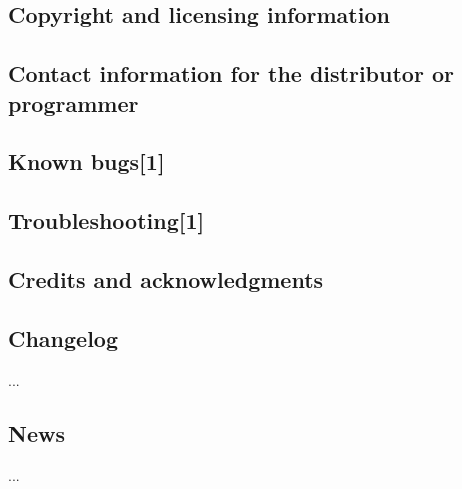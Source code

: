 \subsection*{Copyright and licensing information}

\subsection*{Contact information for the distributor or programmer}

\subsection*{Known bugs\mbox{[}1\mbox{]}}

\subsection*{Troubleshooting\mbox{[}1\mbox{]}}

\subsection*{Credits and acknowledgments}

\subsection*{Changelog}

...

\subsection*{News}

... 